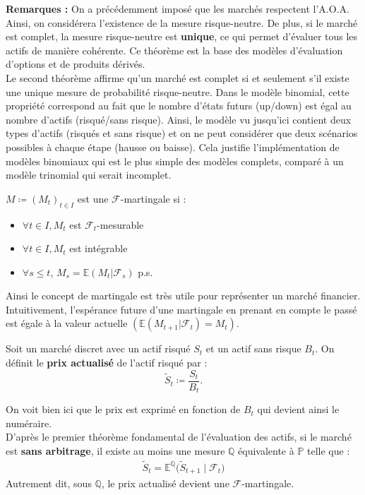 \textbf{Remarques :}
On a précédemment imposé que les marchés respectent l'A.O.A. Ainsi, on considérera l'existence de la mesure risque-neutre. De plus, si le marché est complet, la mesure risque-neutre est \textbf{unique}, ce qui permet d'évaluer tous les actifs de manière cohérente. Ce théorème est la base des modèles d'évaluation d'options et de produits dérivés. \\
Le second théorème affirme qu'un marché est complet si et seulement s'il existe une unique mesure de probabilité risque-neutre. Dans le modèle binomial, cette propriété correspond au fait que le nombre d'états futurs (up/down) est égal au nombre d'actifs (risqué/sans risque). Ainsi, le modèle vu jusqu'ici contient deux types d'actifs (risqués et sans risque) et on ne peut considérer que deux scénarios possibles à chaque étape (hausse ou baisse). Cela justifie l'implémentation de modèles binomiaux qui est le plus simple des modèles complets, comparé à un modèle trinomial qui serait incomplet.

\vspace{0.025\textheight}

\begin{definitionbox}[frametitle = {Martingale}]
    $M \coloneq (M_t)_{t \in I}$ est une $\mathcal{F}$-martingale si : 
    \begin{itemize}
        \item $\forall t \in I, M_t$ est $\mathcal{F}_t$-mesurable
        \item $\forall t \in I, M_t$ est intégrable
        \item $\forall s \le t$, $M_{s} = \mathbb{E}(M_{t} | \mathcal{F}_{s})$ p.s.
    \end{itemize}
\end{definitionbox}
Ainsi le concept de martingale est très utile pour représenter un marché financier. Intuitivement, l'espérance future d'une martingale en prenant en compte le passé est égale à la valeur actuelle $(\mathbb{E}(M_{t+1}|\mathcal{F}_t) = M_t)$.


Soit un marché discret avec un actif risqué $S_t$ et un actif sans risque $B_t$.  
On définit le \textbf{prix actualisé} de l'actif risqué par : 
\[
\tilde{S}_t \coloneq \frac{S_t}{B_t}.
\]
\cite{IntroductionALevaluationDoptions}

\remark On voit bien ici que le prix est exprimé en fonction de $B_t$ qui devient ainsi le numéraire. \\
D'après le premier théorème fondamental de l'évaluation des actifs, si le marché est \textbf{sans arbitrage}, il existe au moins une mesure $\mathbb{Q}$ équivalente à $\mathbb{P}$ telle que :
\begin{align*}
    \tilde{S}_t = \mathbb{E}^{\mathbb{Q}}\big(\tilde{S}_{t+1} \mid \mathcal{F}_t)
\end{align*}
Autrement dit, sous $\mathbb{Q}$, le prix actualisé devient une $\mathcal{F}$-martingale.

